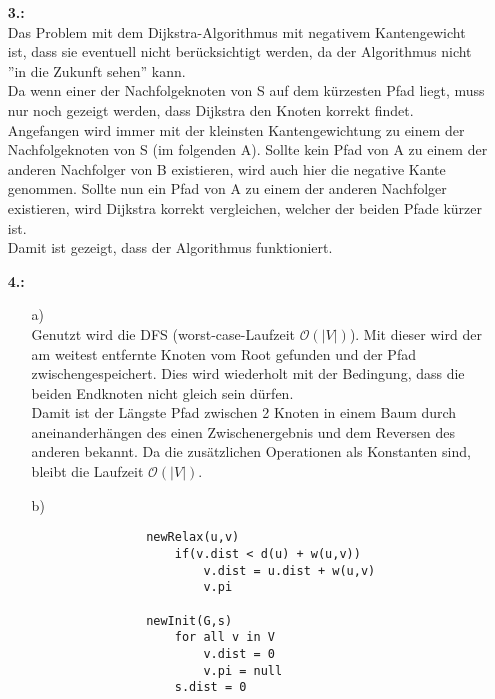 \documentclass[a4paper,11pt,fleqn]{scrartcl}
\begin{document}
\begin{enumerate}
		\item[\textbf{3.:}] \quad \\
			Das Problem mit dem Dijkstra-Algorithmus mit negativem Kantengewicht ist, dass sie eventuell nicht
			berücksichtigt werden, da der Algorithmus nicht ''in die Zukunft sehen'' kann. \\
			Da wenn einer der Nachfolgeknoten von S auf dem kürzesten Pfad liegt, muss nur noch gezeigt werden, 
			dass Dijkstra den Knoten korrekt findet. \\
			Angefangen wird immer mit der kleinsten Kantengewichtung zu einem der Nachfolgeknoten von S (im 
			folgenden A). Sollte kein Pfad von A zu einem der anderen Nachfolger von B existieren, wird auch hier
			die negative Kante genommen. Sollte nun ein Pfad von A zu einem der anderen Nachfolger existieren, 
			wird Dijkstra korrekt vergleichen, welcher der beiden Pfade kürzer ist. \\
			Damit ist gezeigt, dass der Algorithmus funktioniert.
		\item[\textbf{4.:}]
		\begin{enumerate}
			\item[a)] \quad \\
				Genutzt wird die DFS (worst-case-Laufzeit \(\mathcal{O}(|V|)\)). Mit dieser wird der am weitest 
				entfernte Knoten vom Root gefunden und der Pfad zwischengespeichert. Dies wird wiederholt mit der 
				Bedingung, dass die beiden Endknoten nicht gleich sein dürfen. \\
				Damit ist der Längste Pfad zwischen 2 Knoten in einem Baum durch aneinanderhängen des einen 
				Zwischenergebnis und dem Reversen des anderen bekannt. Da die zusätzlichen Operationen 
				als Konstanten sind, bleibt die Laufzeit \(\mathcal{O}(|V|)\). \\
			\item[b)] \quad \\
				\begin{verbatim}
				newRelax(u,v)
				    if(v.dist < d(u) + w(u,v))
				        v.dist = u.dist + w(u,v)
				        v.pi
				
				newInit(G,s)
				    for all v in V
				        v.dist = 0
				        v.pi = null
				    s.dist = 0
				    

\end{verbatim}
\end{enumerate}
\end{enumerate}
\end{document}
